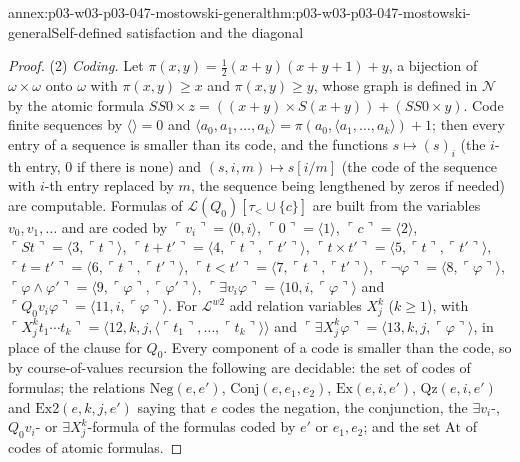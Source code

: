 \begin{annexitem}{annex:p03-w03-p03-047-mostowski-general}{thm:p03-w03-p03-047-mostowski-general}{Self-defined satisfaction and the diagonal}
\begin{proof}
(2) \emph{Coding.}  Let
\(\pi(x,y)=\tfrac12(x+y)(x+y+1)+y\), a bijection of \(\omega\times\omega\)
onto \(\omega\) with \(\pi(x,y)\ge x\) and \(\pi(x,y)\ge y\), whose graph is
defined in \(\mathcal N\) by the atomic formula
\(SS0\times z=((x+y)\times S(x+y))+(SS0\times y)\).  Code finite sequences
by \(\langle\rangle=0\) and
\(\langle a_0,a_1,\dots,a_k\rangle=\pi(a_0,\langle a_1,\dots,a_k\rangle)+1\);
then every entry of a sequence is smaller than its code, and the functions
\(s\mapsto(s)_i\) (the \(i\)-th entry, \(0\) if there is none) and
\((s,i,m)\mapsto s[i/m]\) (the code of the sequence with \(i\)-th entry
replaced by \(m\), the sequence being lengthened by zeros if needed) are
computable.  Formulas of \(\mathscr L(Q_0)[\tau_<\cup\{c\}]\) are built from
the variables \(v_0,v_1,\dots\) and are coded by
\(\ulcorner v_i\urcorner=\langle0,i\rangle\),
\(\ulcorner0\urcorner=\langle1\rangle\),
\(\ulcorner c\urcorner=\langle2\rangle\),
\(\ulcorner St\urcorner=\langle3,\ulcorner t\urcorner\rangle\),
\(\ulcorner t+t'\urcorner=\langle4,\ulcorner t\urcorner,\ulcorner t'\urcorner\rangle\),
\(\ulcorner t\times t'\urcorner=\langle5,\ulcorner t\urcorner,\ulcorner t'\urcorner\rangle\),
\(\ulcorner t=t'\urcorner=\langle6,\ulcorner t\urcorner,\ulcorner t'\urcorner\rangle\),
\(\ulcorner t<t'\urcorner=\langle7,\ulcorner t\urcorner,\ulcorner t'\urcorner\rangle\),
\(\ulcorner\neg\varphi\urcorner=\langle8,\ulcorner\varphi\urcorner\rangle\),
\(\ulcorner\varphi\land\varphi'\urcorner=\langle9,\ulcorner\varphi\urcorner,\ulcorner\varphi'\urcorner\rangle\),
\(\ulcorner\exists v_i\varphi\urcorner=\langle10,i,\ulcorner\varphi\urcorner\rangle\) and
\(\ulcorner Q_0v_i\varphi\urcorner=\langle11,i,\ulcorner\varphi\urcorner\rangle\).
For \(\mathscr L^{w2}\) add relation variables \(X^k_j\) (\(k\ge1\)), with
\(\ulcorner X^k_jt_1\cdots t_k\urcorner=\langle12,k,j,\langle\ulcorner t_1\urcorner,\dots,\ulcorner t_k\urcorner\rangle\rangle\)
and \(\ulcorner\exists X^k_j\varphi\urcorner=\langle13,k,j,\ulcorner\varphi\urcorner\rangle\),
in place of the clause for \(Q_0\).
Every component of a code is smaller than the code, so by course-of-values
recursion the following are decidable: the set of codes of formulas; the
relations \(\mathrm{Neg}(e,e')\), \(\mathrm{Conj}(e,e_1,e_2)\),
\(\mathrm{Ex}(e,i,e')\), \(\mathrm{Qz}(e,i,e')\) and
\(\mathrm{Ex2}(e,k,j,e')\) saying that \(e\) codes the negation, the
conjunction, the \(\exists v_i\)-, \(Q_0v_i\)- or \(\exists X^k_j\)-formula
of the formulas coded by \(e'\) or \(e_1,e_2\); and the set \(\mathrm{At}\)
of codes of atomic formulas.


\end{proof}
\end{annexitem}
